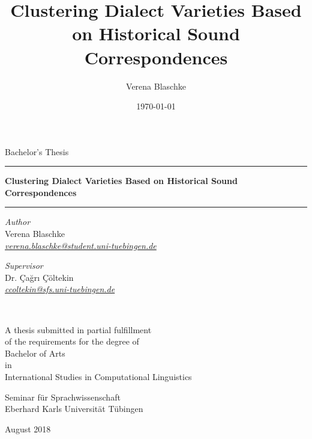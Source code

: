 \documentclass[a4paper]{article}
\title{Clustering Dialect Varieties Based on Historical Sound Correspondences}
\author{Verena Blaschke}
\date{\today}
\begin{document}
\begin{titlepage}
\begin{center}

\vspace*{.15\textheight}

{\Large Bachelor's Thesis}
\vspace{2em}

\hrule
\vspace{0.6cm}
{\huge\bfseries
Clustering Dialect Varieties Based on Historical Sound Correspondences
}\\[0.7cm] 
\hrule
\vspace*{.05\textheight}
 
\begin{minipage}[t]{0.4\textwidth}
\begin{flushleft} 
{\large
\textit{Author}\\
Verena Blaschke}\\
\href{mailto:verena.blaschke@student.uni-tuebingen.de}{\textit{verena.blaschke@student.uni-tuebingen.de}}\\
\end{flushleft}
\end{minipage}
\begin{minipage}[t]{0.4\textwidth}
\begin{flushright}
{\large
\textit{Supervisor}\\
Dr. Çağrı Çöltekin}\\
\href{mailto:ccoltekin@sfs.uni-tuebingen.de}{\textit{ccoltekin@sfs.uni-tuebingen.de}}\\
\end{flushright}
\end{minipage}\\

\vfill

A thesis submitted in partial fulfillment\\
of the requirements for the degree of\\[2mm]
{\large Bachelor of Arts}\\
in\\[1mm]
{\large International Studies in Computational Linguistics}

\vspace*{.1\textheight}

{\large Seminar für Sprachwissenschaft\\
Eberhard Karls Universität Tübingen

\vspace{1em}
August 2018}
\end{center}
  
\end{titlepage}
\end{document}
